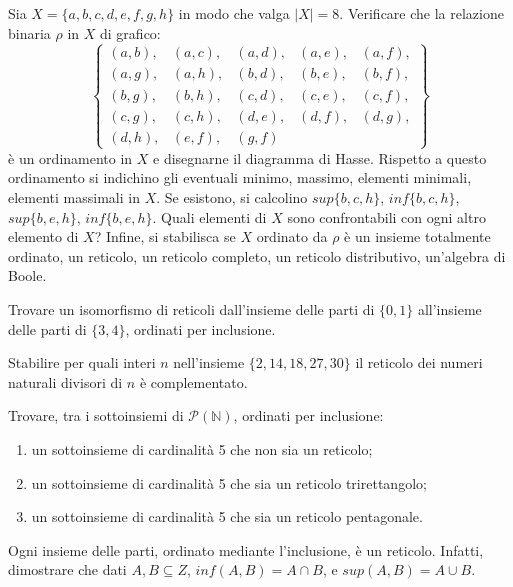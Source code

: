 \begin{exsbox}
	Sia $X=\{a,b,c,d,e,f,g,h\}$ in modo che valga $|X|=8$. Verificare che la relazione binaria $\rho$ in $X$ di grafico:
	\begin{displaymath}
		\left\lbrace
		\begin{array}{lllll}
			(a,b), & (a,c), & (a,d), & (a,e), & (a,f), \\
			(a,g), & (a,h), & (b,d), & (b,e), & (b,f), \\
			(b,g), & (b,h), & (c,d), & (c,e), & (c,f), \\
			(c,g), & (c,h), & (d,e), & (d,f), & (d,g), \\
			(d,h), & (e,f), & (g,f)
		\end{array}
		\right\rbrace
	\end{displaymath}
	è un ordinamento in $X$ e disegnarne il diagramma di Hasse. Rispetto a questo ordinamento si indichino gli eventuali minimo, massimo, elementi minimali, elementi massimali in $X$. Se esistono, si calcolino $sup\{b,c,h\}$, $inf\{b,c,h\}$, $sup\{b,e,h\}$, $inf\{b,e,h\}$. Quali elementi di $X$ sono confrontabili con ogni altro elemento di $X$? Infine, si stabilisca se $X$ ordinato da $\rho$ è un insieme totalmente ordinato, un reticolo, un reticolo completo, un reticolo distributivo, un'algebra di Boole.
\end{exsbox}
\begin{exsbox}
	Trovare un isomorfismo di reticoli dall'insieme delle parti di $\{0,1\}$ all'insieme delle parti di $\{3,4\}$, ordinati per inclusione.
\end{exsbox}

\begin{exsbox}
	Stabilire per quali interi $n$ nell'insieme $\{2,14,18,27,30\}$ il reticolo dei numeri naturali divisori di $n$ è complementato.
\end{exsbox}

\begin{exsbox}
	Trovare, tra i sottoinsiemi di $\mathcal{P}(\mathbb{N})$, ordinati per inclusione:
	\begin{enumerate}
		\item un sottoinsieme di cardinalità 5 che non sia un reticolo;
		\item un sottoinsieme di cardinalità 5 che sia un reticolo trirettangolo;
		\item un sottoinsieme di cardinalità 5 che sia un reticolo pentagonale.
	\end{enumerate}
\end{exsbox}
\begin{exsbox}
	Ogni insieme delle parti, ordinato mediante l’inclusione,
	è un reticolo. Infatti, dimostrare che dati $A, B \subseteq Z$, $inf(A, B) = A \cap B$, e $sup(A, B) = A \cup B$.
\end{exsbox}